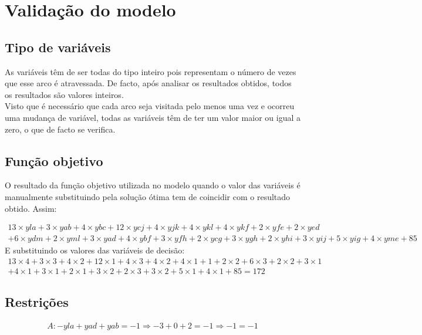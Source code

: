 \documentclass[a4paper]{report}
\begin{document}
\pagebreak
\section{Validação do modelo}
\subsection{Tipo de variáveis}
As variáveis têm de ser todas do tipo inteiro pois representam o número
de vezes que esse arco é atravessada. De facto, após analisar os resultados
obtidos, todos os resultados são valores inteiros.\\
Visto que é necessário que cada arco seja visitada pelo menos uma
vez e ocorreu uma mudança de variável, todas as variáveis têm de ter um valor
maior ou igual a zero, o que de facto se verifica.

\subsection{Função objetivo}
O resultado da função objetivo utilizada no modelo quando o valor
das variáveis é manualmente substituindo pela solução ótima tem de 
coincidir com o resultado obtido.
Assim:

\begin{multline}
13\times yla + 3\times yab + 4\times ybc + 12\times ycj + 4\times
yjk + 4\times ykl + 4\times ykf + 2\times yfe + 2\times yed \\ + 6\times ydm +
2\times yml + 3\times yad + 4\times ybf + 3\times yfh + 2\times ycg +
3\times ygh + 2\times yhi + 3\times yij + 5\times yig + 4\times yme + 85
\end{multline}
E substituindo os valores das variáveis de decisão:
\begin{multline}
13\times 4 + 3\times 3 + 4\times 2 + 12\times 1 + 4\times
3 + 4\times 2 + 4\times 1 + 1 + 2\times 2 + 6\times 3 +
2\times 2 + 3\times 1 \\ + 4\times 1 + 3\times 1 + 2\times 1 +
3\times 2 + 2\times 3 + 3\times 2 + 5\times 1 + 4\times 1 + 85
= 172
\end{multline}

\subsection{Restrições}
\begin{multline}
A: - yla + yad + yab = -1
\Rightarrow - 3 + 0 + 2 = -1 
\Rightarrow -1 = -1
\end{multline}
\end{document}
